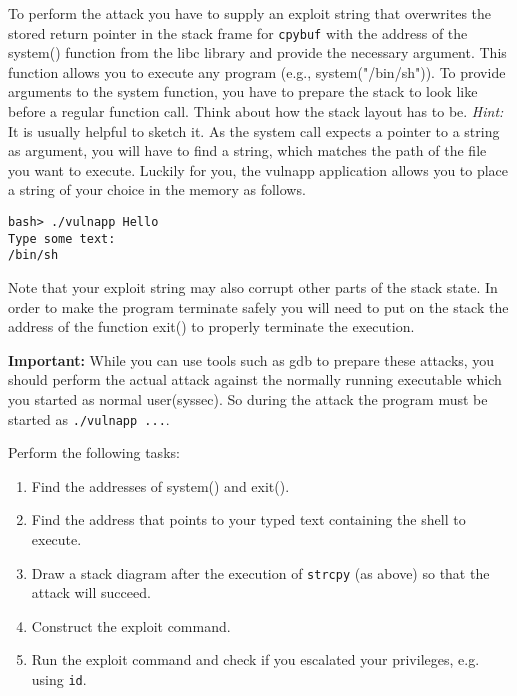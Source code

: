 \documentclass[a4paper,11pt]{article}
\begin{document}
To perform the attack you have to supply an exploit string that overwrites the
stored return pointer in the stack frame for {\tt cpybuf} with the address of
the system() function from the libc library and provide the necessary argument.
This function allows you to execute any program (e.g., system("/bin/sh")). To
provide arguments to the system function, you have to prepare the stack to look
like before a regular function call. Think about how the stack layout has to be.
\textit{Hint:} It is usually helpful to sketch it. As the system call expects a
pointer to a string as argument, you will have to find a string, which matches
the path of the file you want to execute. Luckily for you, the vulnapp
application allows you to place a string of your choice in the memory as
follows.

\begin{verbatim}
bash> ./vulnapp Hello
Type some text:
/bin/sh
\end{verbatim}

Note that your exploit string may also corrupt other parts of the
stack state. In order to make the program terminate safely you will
need to put on the stack the address of the function exit() to
properly terminate the execution. 

\textbf{Important:} While you can use tools such as gdb to prepare these attacks, you should perform the actual attack against the normally running executable which you started as normal user(syssec). So during the attack the program must be started as \verb|./vulnapp ...|.

Perform the following tasks:

\begin{enumerate}
  \item Find the addresses of system() and exit().
  \item Find the address that points to your typed text containing the shell to execute.
  \item Draw a stack diagram after the execution of \texttt{strcpy} (as above) so that the attack will succeed.
  \item Construct the exploit command.
  \item Run the exploit command and check if you escalated your privileges, e.g. using \texttt{id}.
\end{enumerate}
\end{document}
